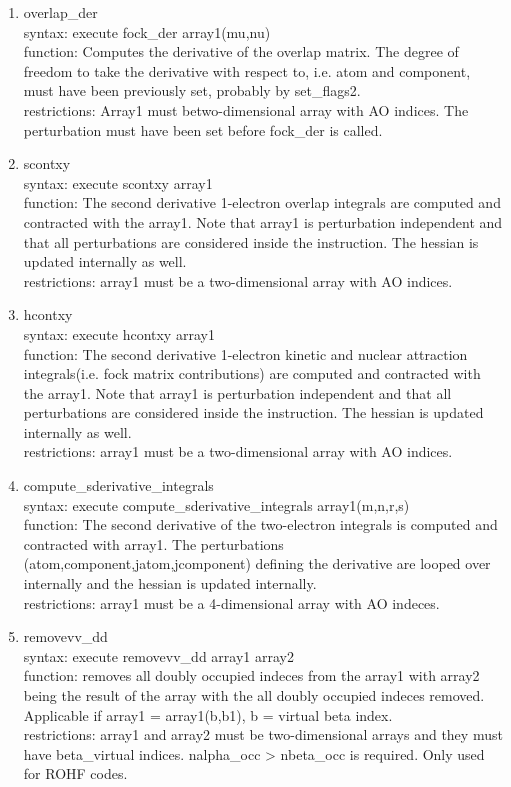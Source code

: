 \documentclass[12pt]{article}
\begin{document}
\begin{enumerate}
\item overlap\_der\\ 
syntax: execute fock\_der array1(mu,nu)\\ 
function: Computes the derivative of the overlap matrix. The degree of freedom to take the 
derivative with respect to, i.e. atom and component, must have been previously set, probably 
by set\_flags2.\\ 
restrictions: Array1 must betwo-dimensional array with AO indices. The perturbation must 
have been set before fock\_der is called.

\item scontxy\\ 
syntax: execute scontxy array1\\ 
function: The second derivative 1-electron overlap integrals are computed and contracted 
with the array1. Note that array1 is perturbation independent and that all perturbations 
are considered inside the instruction. The hessian is updated internally as well.\\ 
restrictions: array1 must be a two-dimensional array with AO indices.

\item hcontxy\\ 
syntax: execute hcontxy array1\\ 
function: The second derivative 1-electron kinetic and nuclear attraction 
integrals(i.e. fock matrix contributions) are computed and contracted with the array1. 
Note that array1 is perturbation independent and that all perturbations are considered 
inside the instruction. The hessian is updated internally as well.\\ 
restrictions: array1 must be a two-dimensional array with AO indices.

\item compute\_sderivative\_integrals\\ 
syntax: execute compute\_sderivative\_integrals array1(m,n,r,s)\\ 
function: The second derivative of the two-electron integrals is computed and contracted 
with array1. The perturbations (atom,component,jatom,jcomponent) defining the derivative are 
looped over internally and the hessian is updated internally.\\ 
restrictions: array1 must be a 4-dimensional array with AO indeces.

\item removevv\_dd\\ 
syntax: execute removevv\_dd array1 array2\\ 
function: removes all doubly occupied indeces from the array1 with array2 being the result 
of the array with the all doubly occupied indeces removed. Applicable if 
array1 = array1(b,b1), b = virtual beta index.\\ 
restrictions: array1 and array2 must be two-dimensional arrays and they must have 
beta\_virtual indices. nalpha\_occ > nbeta\_occ is required. Only used for ROHF codes.


\end{enumerate}
\end{document}
